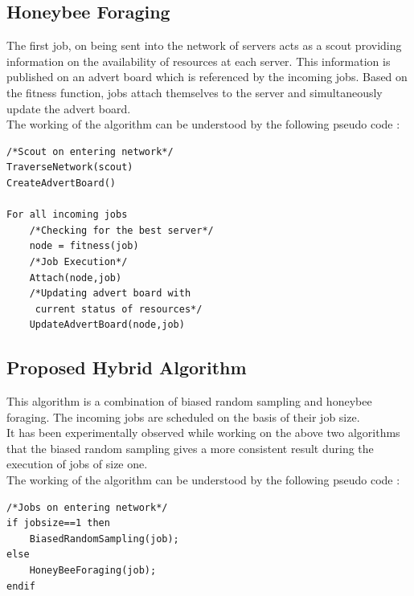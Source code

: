 \subsection{Honeybee Foraging}
The first job, on being sent into the network
of servers acts as a scout providing information
on the availability of resources at each server.
This information is published on an advert board
which is referenced by the incoming jobs. Based
on the fitness function, jobs attach themselves
to the server and simultaneously update the advert
board.\\[0.2cm]
The working of the algorithm can be understood by the following pseudo code :
\begin{verbatim}
/*Scout on entering network*/
TraverseNetwork(scout)
CreateAdvertBoard()

For all incoming jobs
    /*Checking for the best server*/
    node = fitness(job)
    /*Job Execution*/
    Attach(node,job)
    /*Updating advert board with 
     current status of resources*/
    UpdateAdvertBoard(node,job) 
\end{verbatim}

\subsection{Proposed Hybrid Algorithm}
This algorithm is a combination of biased random sampling and honeybee
foraging. The incoming jobs are scheduled on the basis of their job size.\\[0.2cm]
It has been experimentally observed while working on the above two algorithms that the biased random sampling gives a more consistent result
during the execution of jobs of size one.\\[0.2cm]
The working of the algorithm can be understood by the following pseudo code :
\begin{verbatim}
/*Jobs on entering network*/
if jobsize==1 then
    BiasedRandomSampling(job);
else
    HoneyBeeForaging(job);
endif
\end{verbatim}
 
